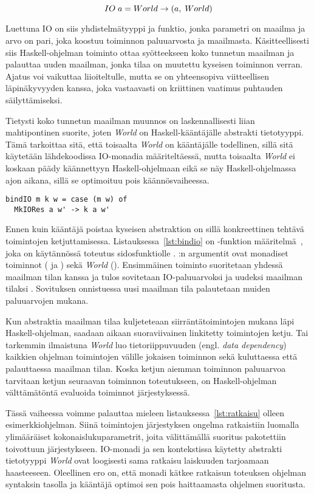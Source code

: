 \documentclass[finnish]{tktltiki2}
\begin{document}
$$ IO\; a = World \rightarrow (a,\; World) $$

Luettuna IO on siis yhdistelmätyyppi ja funktio, jonka parametri on maailma ja arvo on pari, joka
koostuu toiminnon paluuarvosta ja maailmasta. Käsitteellisesti siis Haskell-ohjelman toiminto ottaa
syötteekseen koko tunnetun maailman ja palauttaa uuden maailman, jonka tilaa on muutettu kyseisen
toiminnon verran. Ajatus voi vaikuttaa liioiteltulle, mutta se on yhteensopiva viitteellisen
läpinäkyvyyden kanssa, joka vastaavasti on kriittinen vaatimus puhtauden säilyttämiseksi.

Tietysti koko tunnetun maailman muunnos on laskennallisesti liian mahtipontinen suorite, joten
\emph{World} on Haskell-kääntäjälle abstrakti tietotyyppi. Tämä tarkoittaa sitä, että toisaalta
\emph{World} on kääntäjälle todellinen, sillä sitä käytetään lähdekoodissa IO-monadia
määriteltäessä, mutta toisaalta \emph{World} ei koskaan päädy käännettyyn Haskell-ohjelmaan eikä se
näy Haskell-ohjelmassa ajon aikana, sillä se optimoituu pois käännösvaiheessa.

\begin{lstlisting}[float,label={lst:bindio},caption={IFP, bindIO:n määritelmä}]
bindIO m k w = case (m w) of
  MkIORes a w' -> k a w'
\end{lstlisting}

Ennen kuin kääntäjä poistaa kyseisen abstraktion on sillä konkreettinen tehtävä toimintojen
ketjuttamisessa. Listauksessa~\ref{lst:bindio} on -funktion määritelmä~\cite{ifp93},
joka on käytännössä toteutus sidosfunktiolle \code{(>>=)}. :n argumentit ovat monadiset
toiminnot ( ja ) sekä \emph{World} (). Ensimmäinen toiminto suoritetaan
yhdessä maailman tilan kanssa ja tulos sovitetaan IO-paluuarvoksi  ja uudeksi maailman
tilaksi . Sovituksen onnistuessa uusi maailman tila palautetaan muiden paluuarvojen mukana.

Kun abstraktia maailman tilaa kuljeteteaan siirräntätoimintojen mukana läpi Haskell-ohjelman,
saadaan aikaan suoraviivainen linkitetty toimintojen ketju. Tai tarkemmin ilmaistuna \emph{World}
luo tietoriippuvuuden (engl. \emph{data dependency}) kaikkien ohjelman toimintojen välille jokaisen
toiminnon sekä kuluttaessa että palauttaessa maailman tilan. Koska ketjun aiemman toiminnon
paluuarvoa tarvitaan ketjun seuraavan toiminnon toteutukseen, on Haskell-ohjelman välttämätöntä
evaluoida toiminnot järjestyksessä.

Tässä vaiheessa voimme palauttaa mieleen listauksessa~\ref{lst:ratkaisu} olleen esimerkkiohjelman.
Siinä toimintojen järjestyksen ongelma ratkaistiin luomalla ylimääräiset kokonaislukuparametrit,
joita välittämällä suoritus pakotettiin toivottuun järjestykseen. IO-monadi ja sen kontekstissa
käytetty abstrakti tietotyyppi \emph{World} ovat loogisesti sama ratkaisu laiskuuden
tarjoamaan haasteeseen. Oleellinen ero on, että monadi kätkee ratkaisun toteuksen ohjelman syntaksin
tasolla ja kääntäjä optimoi sen pois haittaamasta ohjelmen suoritusta.
\end{document}
